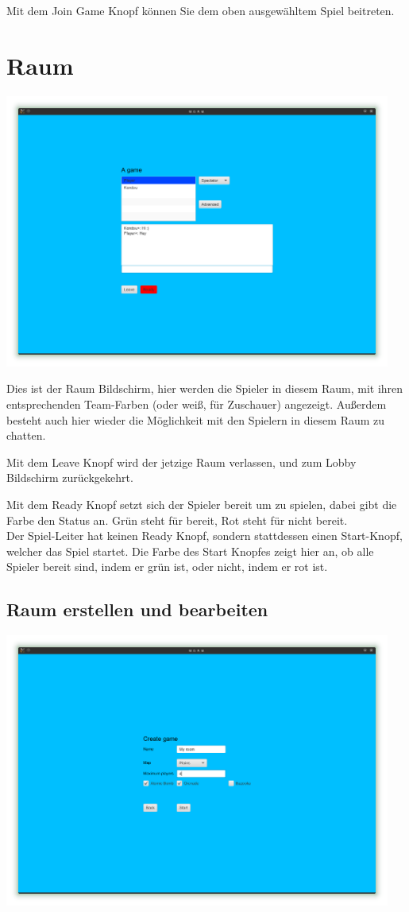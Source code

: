 \documentclass{scrreprt}
\begin{document}
Mit dem Join Game Knopf können Sie dem oben ausgewähltem Spiel beitreten.

\section{Raum}

\includegraphics[height=9cm]{Screenshot10.png}

Dies ist der Raum Bildschirm, hier werden die Spieler in diesem Raum, mit ihren entsprechenden Team-Farben (oder weiß, für
Zuschauer) angezeigt. Außerdem besteht auch hier wieder die Möglichkeit mit den Spielern in diesem Raum zu chatten.

Mit dem Leave Knopf wird der jetzige Raum verlassen, und zum Lobby Bildschirm zurückgekehrt.

Mit dem Ready Knopf setzt sich der Spieler bereit um zu spielen, dabei gibt die Farbe den Status an. Grün steht für bereit,
Rot steht für nicht bereit.\\
Der Spiel-Leiter hat keinen Ready Knopf, sondern stattdessen einen Start-Knopf, welcher das Spiel startet. Die Farbe des Start
Knopfes zeigt hier an, ob alle Spieler bereit sind, indem er grün ist, oder nicht, indem er rot ist.

\subsection{Raum erstellen und bearbeiten}

\includegraphics[height=9cm]{Screenshot14.png}
\end{document}
